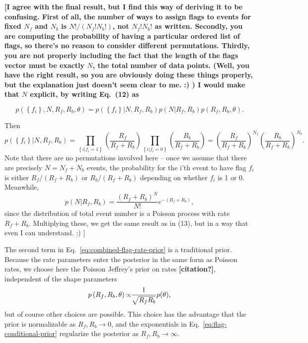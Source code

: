 \documentclass[aps,prd]{revtex4-1}
\newcommand{\mathset}[1]{\left\{ #1 \right\}}
\newcommand{\ilya}[1]{{\color{red} \bf #1}}
\begin{document}
\ilya{[I agree with the final result, but I find this way of deriving it to be confusing.  First of all, the number of ways to assign flags to events for fixed $N_f$ and $N_b$ is $N!/(N_f! N_b!)$, not $N_f! N_b!$ as written.  Secondly, you are computing the probability of having a particular ordered list of flags, so there's no reason to consider different permutations.  Thirdly, you are not properly including the fact that the length of the flags vector must be exactly $N$, the total number of data points.  (Well, you have the right result, so you are obviously doing these things properly, but the explanation just doesn't seem clear to me. :) )  I would make that $N$ explicit, by writing Eq.~(12) as 

$$
  p\left(\mathset{f_i}, N, R_f, R_b, \theta\right)  = 
  p\left( \mathset{f_i} | N, R_f, R_b\right) p\left(N |R_f, R_b\right)  
 p\left(R_f, R_b, \theta\right).
$$

Then 
$$ p\left( \mathset{f_i} | N, R_f, R_b\right) = 
\prod_{\mathset{i|f_i=1}} \left(\frac{R_f}{R_f+R_b}\right) 
\prod_{\mathset{i|f_i=0}} \left(\frac{R_b}{R_f+R_b}\right) =
\left(\frac{R_f}{R_f+R_b}\right)^{N_f} \left(\frac{R_b}{R_f+R_b}\right)^{N_b}. 
$$
Note that there are no permutations involved here -- once we assume that there are precisely $N=N_f+N_b$ events, the probability for the i'th event to have flag $f_i$ is either $R_f/(R_f+R_b)$ or $R_b/(R_f+R_b)$ depending on whether $f_i$ is 1 or 0.
Meanwhile,
$$
p\left(N |R_f, R_b\right) = \frac{\left(R_f+R_b\right)^N}{N!} e^{-(R_f+R_b)},
$$
since the distribution of total event number is a Poisson process with rate $R_f+R_b$.
Multiplying these, we get the same result as in (13), but in a way that even I can understand. :)
]}

The second term in Eq.~\eqref{eq:combined-flag-rate-prior} is a
traditional prior.  Because the rate parameters enter the posterior in
the same form as Poisson rates, we choose here the Poisson Jeffrey's
prior on rates \ilya{[citation?]}, independent of the shape parameters
\begin{equation}
  p\left( R_f, R_b, \theta\right) \ilya{\propto} \frac{1}{\sqrt{R_f R_b}} p(\theta),
\end{equation}
but of course other choices are possible.  This choice has the
advantage that the prior is normalizable as $R_f, R_b \to 0$, and the
exponentials in Eq.~\eqref{eq:flag-conditional-prior} regularize the
posterior as $R_f, R_b \to \infty$.
\end{document}
